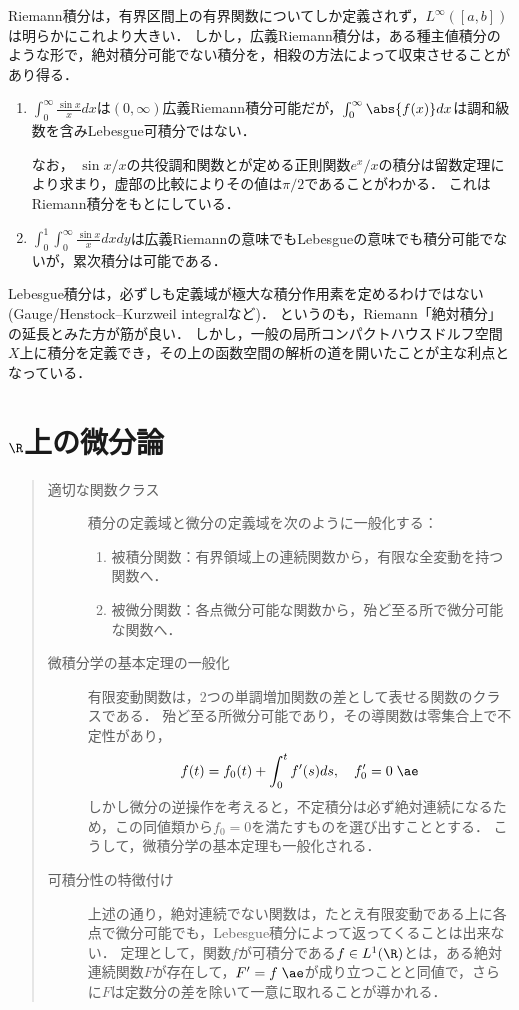 \documentclass[uplatex, dvipdfmx]{jsreport}
\begin{document}
\begin{remark}[Lebesgue可積分性と広義Riemann積分]\label{remark-Lebesgue-integral-and-Riemann-integral}
    Riemann積分は，有界区間上の有界関数についてしか定義されず，$L^\infty([a,b])$は明らかにこれより大きい．
    しかし，広義Riemann積分は，ある種主値積分のような形で，絶対積分可能でない積分を，相殺の方法によって収束させることがあり得る．
    \begin{enumerate}
        \item $\int^\infty_0\frac{\sin x}{x}dx$は$(0,\infty)$広義Riemann積分可能だが，$\int^\infty_0\abs{f(x)}dx$は調和級数を含みLebesgue可積分ではない．
        
        なお，
        $\sin x/x$の共役調和関数とが定める正則関数$e^x/x$の積分は留数定理により求まり，虚部の比較によりその値は$\pi/2$であることがわかる．
        これはRiemann積分をもとにしている．
        \item $\int^1_0\int^\infty_0\frac{\sin x}{x}dxdy$は広義Riemannの意味でもLebesgueの意味でも積分可能でないが，累次積分は可能である．
    \end{enumerate}
    Lebesgue積分は，必ずしも定義域が極大な積分作用素を定めるわけではない(Gauge/Henstock–Kurzweil integralなど)．
    というのも，Riemann「絶対積分」の延長とみた方が筋が良い．
    しかし，一般の局所コンパクトハウスドルフ空間$X$上に積分を定義でき，その上の函数空間の解析の道を開いたことが主な利点となっている．
\end{remark}

\chapter{$\R$上の微分論}

\begin{quote}
    \begin{description}
        \item[適切な関数クラス] 積分の定義域と微分の定義域を次のように一般化する：
        \begin{enumerate}
            \item 被積分関数：有界領域上の連続関数から，有限な全変動を持つ関数へ．
            \item 被微分関数：各点微分可能な関数から，殆ど至る所で微分可能な関数へ．
        \end{enumerate}
        \item[微積分学の基本定理の一般化] 有限変動関数は，2つの単調増加関数の差として表せる関数のクラスである．
        殆ど至る所微分可能であり，その導関数は零集合上で不定性があり，
        \[f(t)=f_0(t)+\int^t_0f'(s)ds,\quad f_0'=0\;\ae\]
        しかし微分の逆操作を考えると，不定積分は必ず絶対連続になるため，この同値類から$f_0=0$を満たすものを選び出すこととする．
        こうして，微積分学の基本定理も一般化される．
        \item[可積分性の特徴付け] 上述の通り，絶対連続でない関数は，たとえ有限変動である上に各点で微分可能でも，Lebesgue積分によって返ってくることは出来ない．
        定理として，関数$f$が可積分である$f\in L^1(\R)$とは，ある絶対連続関数$F$が存在して，$F'=f\;\ae$が成り立つことと同値で，さらに$F$は定数分の差を除いて一意に取れることが導かれる．
    \end{description}
\end{quote}
\end{document}
